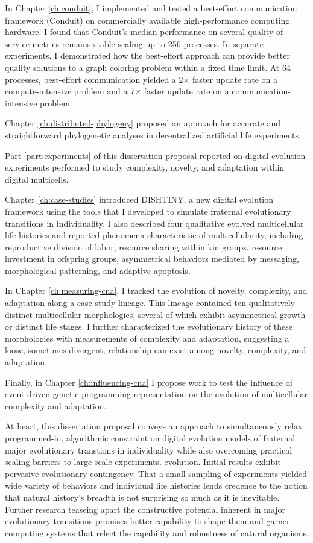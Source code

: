 In Chapter \ref{ch:conduit}, I implemented and tested a best-effort communication framework (Conduit) on commercially available high-performance computing hardware.
I found that Conduit's median performance on several quality-of-service metrics remains stable scaling up to 256 processes.
In separate experiments, I demonstrated how the best-effort approach can provide better quality solutions to a graph coloring problem within a fixed time limit.
At 64 processes, best-effort communication yielded a 2$\times$ faster update rate on a compute-intensive problem and a 7$\times$ faster update rate on a communication-intensive problem.

Chapter \ref{ch:distributed-phylogeny} proposed an approach for accurate and straightforward phylogenetic analyses in decentralized artificial life experiments.

Part \ref{part:experiments} of this dissertation proposal reported on digital evolution experiments performed to study complexity, novelty, and adaptation within digital multicells.

Chapter \ref{ch:case-studies} introduced DISHTINY, a new digital evolution framework using the tools that I developed to simulate fraternal evolutionary transitions in individuality.
I also described four qualitative evolved multicellular life histories and reported phenomena characteristic of multicellularity, including reproductive division of labor, resource sharing within kin groups, resource investment in offspring groups, asymmetrical behaviors mediated by messaging, morphological patterning, and adaptive apoptosis.

In Chapter \ref{ch:measuring-cna}, I tracked the evolution of novelty, complexity, and adaptation along a case study lineage.
This lineage contained ten qualitatively distinct multicellular morphologies, several of which exhibit asymmetrical growth or distinct life stages.
I further characterized the evolutionary history of these morphologies with measurements of complexity and adaptation, suggesting a loose, sometimes divergent, relationship can exist among novelty, complexity, and adaptation.

Finally, in Chapter \ref{ch:influencing-cna} I propose work to test the influence of event-driven genetic programming representation on the evolution of multicellular complexity and adaptation.

At heart, this dissertation proposal conveys an approach to simultaneously relax programmed-in, algorithmic constraint on digital evolution models of fraternal major evolutionary transtions in individuality while also overcoming practical scaling barriers to large-scale experiments.
evolution.
Initial results exhibit pervasive evolutionary contingency.
That a small sampling of experiments yielded wide variety of behaviors and individual life histories lends credence to the notion that natural history's breadth is not surprising so much as it is inevitable.
Further research teaseing apart the constructive potential inherent in major evolutionary transitions promises better capability to shape them and garner computing systems that relect the capability and robustness of natural organisms.

